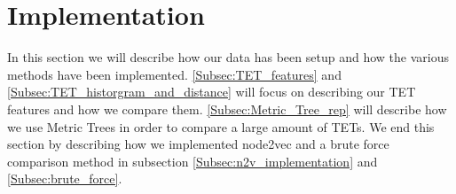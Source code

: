 \section{Implementation}\label{Sec:Implementation}
In this section we will describe how our data has been setup and how the various methods have been implemented. \autoref{Subsec:TET_features} and \autoref{Subsec:TET_historgram_and_distance} will focus on describing our TET features and how we compare them.
\autoref{Subsec:Metric_Tree_rep} will describe how we use Metric Trees in order to compare a large amount of TETs. We end this section by describing how we implemented node2vec and a brute force comparison method in subsection \autoref{Subsec:n2v_implementation} and \autoref{Subsec:brute_force}.






